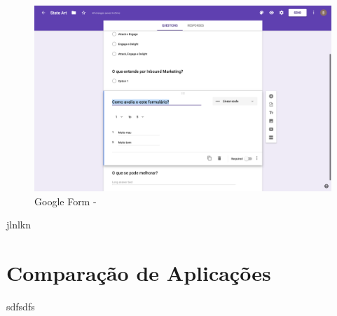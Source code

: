\begin{figure}[h!]
	\begin{center}
		\includegraphics[width=1\textwidth]{img/gf/gf-form-imported}
		\caption{Google Form - }
		\label{fig:gf-form-imported}
	\end{center}
\end{figure}



\newpage
\newpage
\newpage
jlnlkn
\section{Comparação de Aplicações}
\label{comparacao}

sdfsdfs

\blankpage

\glsresetall



